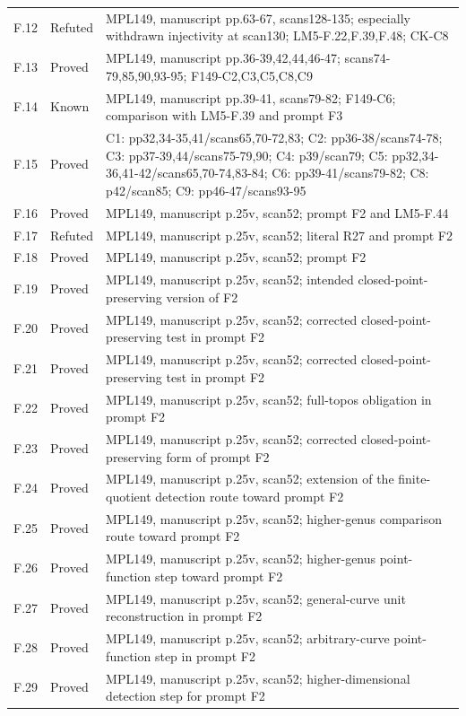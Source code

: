 {\begin{longtable}{p{1.9cm}p{1.7cm}p{10.3cm}}
F.12 & Refuted & MPL149, manuscript pp.63-67, scans128-135; especially withdrawn injectivity at scan130; LM5-F.22,F.39,F.48; CK-C8 \\
F.13 & Proved & MPL149, manuscript pp.36-39,42,44,46-47; scans74-79,85,90,93-95; F149-C2,C3,C5,C8,C9 \\
F.14 & Known & MPL149, manuscript pp.39-41, scans79-82; F149-C6; comparison with LM5-F.39 and prompt F3 \\
F.15 & Proved & C1: pp32,34-35,41/scans65,70-72,83; C2: pp36-38/scans74-78; C3: pp37-39,44/scans75-79,90; C4: p39/scan79; C5: pp32,34-36,41-42/scans65,70-74,83-84; C6: pp39-41/scans79-82; C8: p42/scan85; C9: pp46-47/scans93-95 \\
F.16 & Proved & MPL149, manuscript p.25v, scan52; prompt F2 and LM5-F.44 \\
F.17 & Refuted & MPL149, manuscript p.25v, scan52; literal R27 and prompt F2 \\
F.18 & Proved & MPL149, manuscript p.25v, scan52; prompt F2 \\
F.19 & Proved & MPL149, manuscript p.25v, scan52; intended closed-point-preserving version of F2 \\
F.20 & Proved & MPL149, manuscript p.25v, scan52; corrected closed-point-preserving test in prompt F2 \\
F.21 & Proved & MPL149, manuscript p.25v, scan52; corrected closed-point-preserving test in prompt F2 \\
F.22 & Proved & MPL149, manuscript p.25v, scan52; full-topos obligation in prompt F2 \\
F.23 & Proved & MPL149, manuscript p.25v, scan52; corrected closed-point-preserving form of prompt F2 \\
F.24 & Proved & MPL149, manuscript p.25v, scan52; extension of the finite-quotient detection route toward prompt F2 \\
F.25 & Proved & MPL149, manuscript p.25v, scan52; higher-genus comparison route toward prompt F2 \\
F.26 & Proved & MPL149, manuscript p.25v, scan52; higher-genus point-function step toward prompt F2 \\
F.27 & Proved & MPL149, manuscript p.25v, scan52; general-curve unit reconstruction in prompt F2 \\
F.28 & Proved & MPL149, manuscript p.25v, scan52; arbitrary-curve point-function step in prompt F2 \\
F.29 & Proved & MPL149, manuscript p.25v, scan52; higher-dimensional detection step for prompt F2 \\

\end{longtable}}
